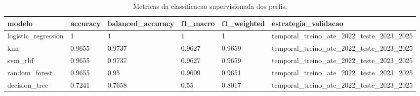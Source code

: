 \begin{table}[htbp]
\centering
\caption{Metricas da classificacao supervisionada dos perfis.}
\label{tab:metricas-classificacao}
\begin{tabular}{llllll}
\hline
modelo & accuracy & balanced\_accuracy & f1\_macro & f1\_weighted & estrategia\_validacao \\
\hline
logistic\_regression & 1 & 1 & 1 & 1 & temporal\_treino\_ate\_2022\_teste\_2023\_2025 \\
knn & 0.9655 & 0.9737 & 0.9627 & 0.9659 & temporal\_treino\_ate\_2022\_teste\_2023\_2025 \\
svm\_rbf & 0.9655 & 0.9737 & 0.9627 & 0.9659 & temporal\_treino\_ate\_2022\_teste\_2023\_2025 \\
random\_forest & 0.9655 & 0.95 & 0.9609 & 0.9651 & temporal\_treino\_ate\_2022\_teste\_2023\_2025 \\
decision\_tree & 0.7241 & 0.7658 & 0.55 & 0.8017 & temporal\_treino\_ate\_2022\_teste\_2023\_2025 \\
\hline
\end{tabular}
\end{table}
